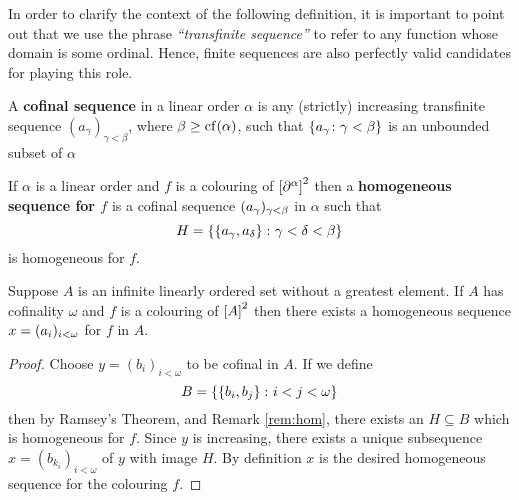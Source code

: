 In order to clarify the context of the following definition, it is important to
point out that we use the phrase \textit{``transfinite sequence''} to refer to
any function whose domain is some ordinal.  Hence, finite sequences are also
perfectly valid candidates for playing this role.

\begin{dfn}
	A \textbf{cofinal sequence} in a linear order $\alpha$ is any (strictly)
	increasing transfinite sequence $(a_\gamma)_{\gamma<\beta}$, where
	$\beta\geq\cf(\alpha)$, such that $\setbuild{a_\gamma}{\gamma<\beta}$ is an
	unbounded subset of $\alpha$
\end{dfn}

\begin{dfn}
	If $\alpha$ is a linear order and $f$ is a colouring of
	$\subsets{2}{\domain\alpha}$ then a \textbf{homogeneous sequence for $f$}
	is a cofinal sequence $\family{a_\gamma}{\gamma<\beta}$ in $\alpha$ such
	that
	\begin{equation}
		H=\setbuild{\set{a_\gamma,a_\delta}}{\gamma<\delta<\beta}
	\end{equation}
	is homogeneous for $f$.
\end{dfn}

\begin{cor}\label{cor:Cofinal}
	Suppose $A$ is an infinite linearly ordered set without a greatest element.
	If $A$ has cofinality $\omega$ and $f$ is a colouring of $\subsets{2}{A}$
	then there exists a homogeneous sequence $x=\family{a_i}{i<\omega}$ for $f$
	in $A$.
\end{cor}

\begin{proof}
	Choose $y=(b_i)_{i<\omega}$ to be cofinal in $A$.  If we define
	\begin{equation}
		B=\setbuild{\set{b_i,b_j}}{i<j<\omega}
	\end{equation}
	then by Ramsey's Theorem, and Remark \ref{rem:hom}, there exists an
	$H\subseteq B$ which is homogeneous for $f$.  Since $y$ is increasing,
	there exists a unique subsequence $x=(b_{k_i})_{i<\omega}$ of $y$ with
	image $H$.  By definition $x$ is the desired homogeneous sequence for the
	colouring $f$.
\end{proof}


